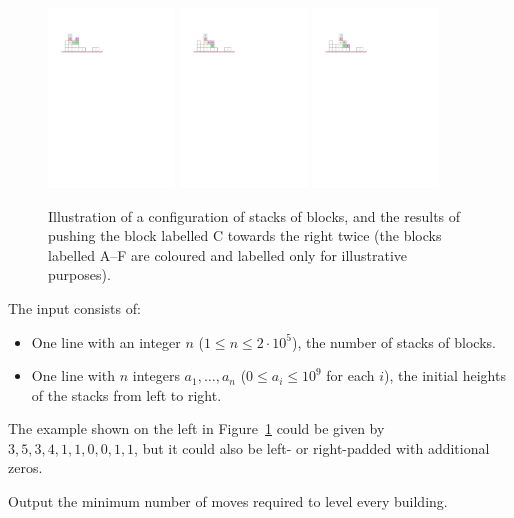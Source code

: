 \begin{figure}[!h]
    \centering
    \includegraphics[width=0.3\textwidth]{fig1}
    \quad
    \includegraphics[width=0.3\textwidth]{fig2}
    \quad
    \includegraphics[width=0.3\textwidth]{fig3}
    \caption{Illustration of a configuration of stacks of blocks, and the results of pushing the block labelled C towards the right twice (the blocks labelled A--F are coloured and labelled only for illustrative purposes).}
    \label{fig:bulldozer}
\end{figure}


\begin{Input}
The input consists of:

\begin{itemize}
\item One line with an integer $n$ ($1 \le n \leq 2 \cdot 10^5$), the number of stacks of blocks.
\item One line with $n$ integers $a_1, \ldots, a_n$ ($0 \leq a_i \leq 10^9$ for each $i$), the
  initial heights of the stacks from left to right.
\end{itemize}

The example shown on the left in Figure~\ref{fig:bulldozer} could be
given by $3, 5, 3, 4, 1, 1, 0, 0, 1, 1$, but it could also be left- or
right-padded with additional zeros.
\end{Input}

\begin{Output}
Output the minimum number of moves required to level every building.
\end{Output}

